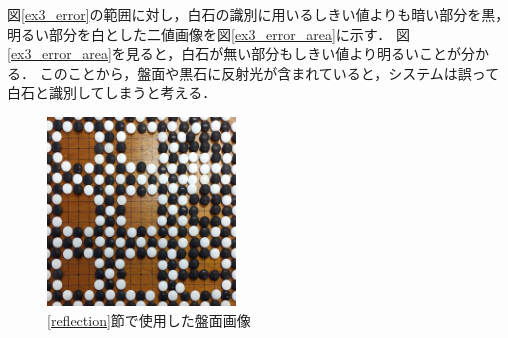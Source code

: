 \documentclass[summary]{nitocs}
\numberwithin{equation}{section}
\begin{document}
            図\ref{ex3_error}の範囲に対し，白石の識別に用いるしきい値よりも暗い部分を黒，明るい部分を白とした二値画像を図\ref{ex3_error_area}に示す．
            図\ref{ex3_error_area}を見ると，白石が無い部分もしきい値より明るいことが分かる．
            このことから，盤面や黒石に反射光が含まれていると，システムは誤って白石と識別してしまうと考える．
            \begin{figure}[tb] %
                \begin{center}
                \includegraphics[clip,width=50mm]{DSC_0098/boardImg.jpg} 
                \caption{\ref{reflection}節で使用した盤面画像}
                \label{ex3_img}
                \end{center}
            \end{figure}
\end{document}
